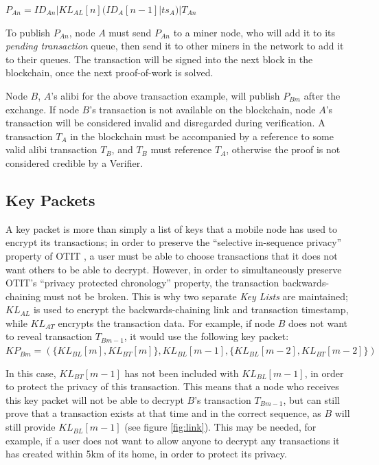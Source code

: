 $P_{An} = ID_{An}|KL_{AL}[n](ID_{A}[n-1]|ts_A)|T_{An}$

\null
To publish $P_{An}$, node $A$ must send $P_{An}$ to a miner node, who will add it to its \textit{pending transaction} queue, then send it to other miners in the network to add it to their queues. The transaction will be signed into the next block in the blockchain, once the next proof-of-work is solved.

Node $B$, $A$'s alibi for the above transaction example, will publish $P_{Bm}$ after the exchange. If node $B$'s transaction is not available on the blockchain, node $A$'s transaction will be considered invalid and disregarded during verification. A transaction $T_A$ in the blockchain must be accompanied by a reference to some valid alibi transaction $T_B$, and $T_B$ must reference $T_A$, otherwise the proof is not considered credible by a Verifier.

\subsection{Key Packets} \label{sssec:key_packets}
A key packet is more than simply a list of keys that a mobile node has used to encrypt its transactions; in order to preserve the ``selective in-sequence privacy'' property of OTIT \cite{otit}, a user must be able to choose transactions that it does not want others to be able to decrypt. However, in order to simultaneously preserve OTIT's ``privacy protected chronology'' property, the transaction backwards-chaining must not be broken. This is why two separate \textit{Key Lists} are maintained; $KL_{AL}$ is used to encrypt the backwards-chaining link and transaction timestamp, while $KL_{AT}$ encrypts the transaction data. For example, if node $B$ does not want to reveal transaction $T_{Bm-1}$, it would use the following key packet:
\\

${KP_{Bm} = (\{KL_{BL}[m], KL_{BT}[m]\}, KL_{BL}[m-1], \{KL_{BL}[m-2], KL_{BT}[m-2]\})}$

\null
In this case, $KL_{BT}[m-1]$ has not been included with $KL_{BL}[m-1]$, in order to protect the privacy of this transaction. This means that a node who receives this key packet will not be able to decrypt $B$'s transaction $T_{Bm-1}$, but can still prove that a transaction exists at that time and in the correct sequence, as $B$ will still provide $KL_{BL}[m-1]$ (see figure \ref{fig:link}). This may be needed, for example, if a user does not want to allow anyone to decrypt any transactions it has created within 5km of its home, in order to protect its privacy.

